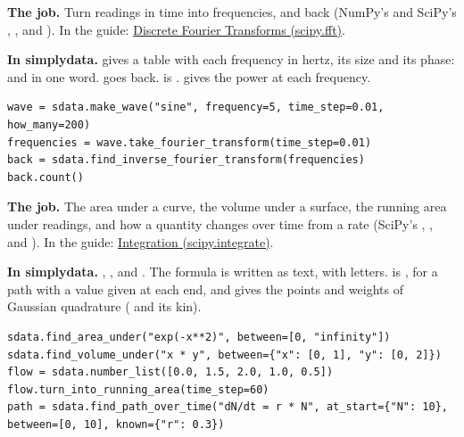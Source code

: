 
\textbf{The job.} Turn readings in time into frequencies, and back (NumPy's and SciPy's ,
,  and ). In the guide:
\href{https://docs.scipy.org/doc/scipy/tutorial/fft.html}{Discrete Fourier Transforms (scipy.fft)}.

\textbf{In simplydata.}  gives a table with each
frequency in hertz, its size and its phase:  and  in one word.
 goes back.  is
.  gives the power at each frequency.

\begin{lstlisting}[style=py]
wave = sdata.make_wave("sine", frequency=5, time_step=0.01, how_many=200)
frequencies = wave.take_fourier_transform(time_step=0.01)
back = sdata.find_inverse_fourier_transform(frequencies)
back.count()
\end{lstlisting}


\textbf{The job.} The area under a curve, the volume under a surface, the running area under readings,
and how a quantity changes over time from a rate (SciPy's , ,
 and ). In the guide:
\href{https://docs.scipy.org/doc/scipy/tutorial/integrate.html}{Integration (scipy.integrate)}.

\textbf{In simplydata.} , ,
 and . The formula is written
as text, with letters.  is , for a path with a value
given at each end, and  gives the points and weights of Gaussian quadrature
( and its kin).

\begin{lstlisting}[style=py]
sdata.find_area_under("exp(-x**2)", between=[0, "infinity"])
sdata.find_volume_under("x * y", between={"x": [0, 1], "y": [0, 2]})
flow = sdata.number_list([0.0, 1.5, 2.0, 1.0, 0.5])
flow.turn_into_running_area(time_step=60)
path = sdata.find_path_over_time("dN/dt = r * N", at_start={"N": 10}, between=[0, 10], known={"r": 0.3})
\end{lstlisting}

